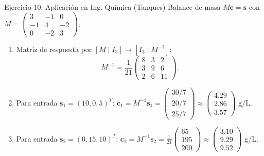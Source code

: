 \documentclass[11pt]{beamer}
\newcommand{\vv}[1]{\mathbf{#1}}
\begin{document}
\begin{frame}{Ejercicio 10: Aplicación en Ing. Química (Tanques)}
  Balance de masa $M\vv{c} = \vv{s}$ con $M = \begin{pmatrix} 3 & -1 & 0 \\ -1 & 4 & -2 \\ 0 & -2 & 3 \end{pmatrix}$:
  \begin{enumerate}
    \item Matriz de respuesta por $[M \mid I_3] \to [I_3 \mid M^{-1}]$:
          \[
            M^{-1} = \frac{1}{21} \begin{pmatrix} 8 & 3 & 2 \\ 3 & 9 & 6 \\ 2 & 6 & 11 \end{pmatrix}.
          \]
    \item Para entrada $\vv{s}_1 = (10, 0, 5)^T$:
          $\vv{c}_1 = M^{-1}\vv{s}_1 = \begin{pmatrix} 30/7 \\ 20/7 \\ 25/7 \end{pmatrix} \approx \begin{pmatrix} 4.29 \\ 2.86 \\ 3.57 \end{pmatrix}$ g/L.
    \item Para entrada $\vv{s}_2 = (0, 15, 10)^T$:
          $\vv{c}_2 = M^{-1}\vv{s}_2 = \frac{1}{21} \begin{pmatrix} 65 \\ 195 \\ 200 \end{pmatrix} \approx \begin{pmatrix} 3.10 \\ 9.29 \\ 9.52 \end{pmatrix}$ g/L.
  \end{enumerate}
\end{frame}
\end{document}
